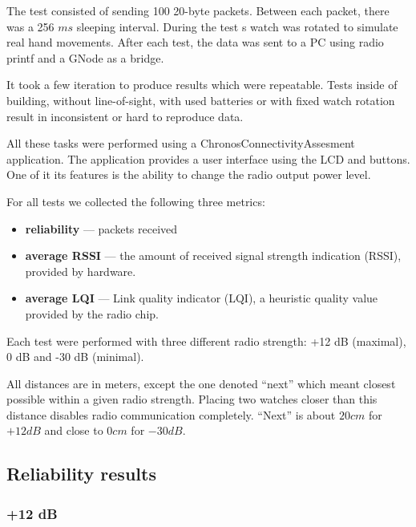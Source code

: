 The test consisted of sending 100 20-byte packets.
Between each packet, there was a 256 $ ms $ sleeping interval.
During the test s watch was rotated to simulate real hand movements.
After each test, the data was sent to a PC using radio printf and a GNode as a bridge.

It took a few iteration to produce results which were repeatable.
Tests inside of building, without line-of-sight, with used batteries or with fixed watch rotation result in inconsistent or hard to reproduce data.

All these tasks were performed using a ChronosConnectivityAssesment application.
The application provides a user interface using the LCD and buttons.
One of it its features is the ability to change the radio output power level.

For all tests we collected the following three metrics:
\begin{itemize}
  \item \textbf{reliability} --- packets received
  \item \textbf{average RSSI} --- the amount of received signal strength indication (RSSI), provided by hardware.
  \item \textbf{average LQI} --- Link quality indicator (LQI), a heuristic quality value provided by the radio chip.
\end{itemize}

Each test were performed with three different radio strength: +12 dB (maximal), 0 dB and -30 dB (minimal).

All distances are in meters, except the one denoted ``next''  which meant closest possible within a given radio strength.
Placing two watches closer than this distance disables radio communication completely.
``Next'' is about $20 cm$ for $+12 dB$ and close to $0 cm$ for $- 30 dB$.



\subsection{Reliability results}

\subsubsection{+12 dB}

